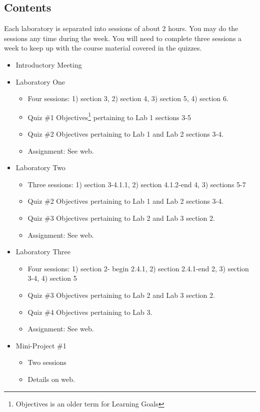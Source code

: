 \documentclass[11pt]{article}
\begin{document}
\subsection*{Contents}

Each laboratory is separated into sessions of about 2 hours.  You may do the 
sessions any time during the week.  You will need to complete three sessions
a week to keep up with the course material covered in the quizzes.

\begin{itemize}
\item Introductory Meeting
\item Laboratory One
\begin{itemize}
\item Four sessions: 1) section 3, 2) section 4, 3) section 5, 4) section 6.
\item Quiz \#1 Objectives\footnote{Objectives is an older term for Learning Goals} pertaining to Lab 1 sections 3-5
\item Quiz \#2 Objectives pertaining to Lab 1 and Lab 2 sections 3-4.
\item Assignment: See web.
\end{itemize}
\item Laboratory Two
\begin{itemize} 
\item Three sessions: 1) section 3-4.1.1, 2) section 4.1.2-end 4, 3) sections 5-7
\item Quiz \#2 Objectives pertaining to Lab 1 and Lab 2 sections 3-4.
\item Quiz \#3 Objectives pertaining to Lab 2 and Lab 3 section 2.
\item Assignment: See web.
\end{itemize} 
\item Laboratory Three
\begin{itemize}
\item Four sessions: 1) section 2- begin 2.4.1, 2) section 2.4.1-end 2, 3) section 3-4, 4) section 5
\item Quiz \#3 Objectives pertaining to Lab 2 and Lab 3 section 2.
\item Quiz \#4 Objectives pertaining to Lab 3.
\item Assignment: See web.
\end{itemize}
\item Mini-Project \#1
\begin{itemize}
\item Two sessions
\item Details on web.

\end{itemize}
\end{itemize}
\end{document}
